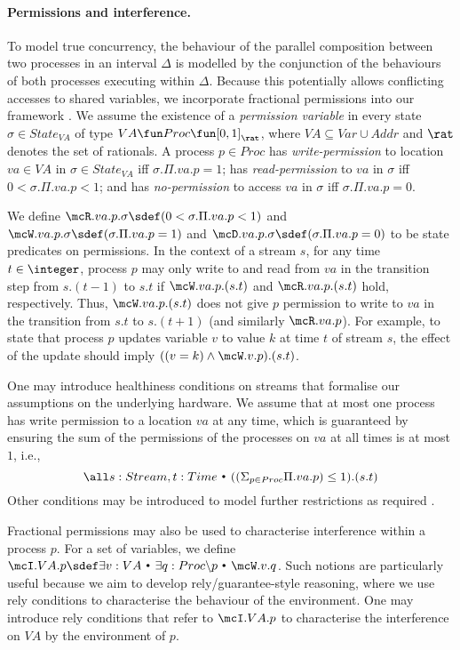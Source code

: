 \documentclass{article}
\newcommand{\st}{~{\scriptscriptstyle ^\bullet}~}
\theoremstyle{plain}
\theoremstyle{definition}
\def \bs {\backslash}
\begin{document}
\paragraph{Permissions and interference.}  
To model true concurrency, the behaviour of the parallel composition
between two processes in an interval $\Delta$ is modelled by the
conjunction of the behaviours of both processes executing within
$\Delta$. Because this potentially allows conflicting accesses to
shared variables, we incorporate fractional permissions into our
framework \cite{Boy03,DDH12}.  We assume the existence of a {\em
  permission variable} in every state $\sigma \in State_{VA}$ of type
$VA \fun Proc \fun [0,1]_\rat$, where $VA \subseteq Var \cup Addr$ and
$\rat$ denotes the set of rationals.
A process $p \in Proc$ has {\em write-permission} to location $va\in
VA$ in $\sigma \in State_{VA}$ iff $\sigma.\Pi.va.p = 1$; has {\em
  read-permission} to $va$ in $\sigma$ iff $0 < \sigma.\Pi.va.p < 1$;
and has {\em no-permission} to access $va$ in $\sigma$ iff
$\sigma.\Pi.va.p = 0$.


We define $\mcR.va.p.\sigma \sdef (0 < \sigma.\Pi.va.p < 1)$ and
$\mcW.va.p.\sigma \sdef (\sigma.\Pi.va.p = 1)$ and $\mcD.va.p.\sigma
\sdef (\sigma.\Pi.va.p = 0)$ to be state predicates on permissions.
In the context of a stream $s$, for any time $t \in \integer$, process
$p$ may only write to and read from $va$ in the transition step from
$s.(t-1)$ to $s.t$ if $\mcW.va.p.(s.t)$ and $\mcR.va.p.(s.t)$ hold,
respectively. Thus, $\mcW.va.p.(s.t)$ does not give $p$ permission to write to $va$
in the transition from $s.t$ to $s.(t+1)$ (and similarly $\mcR.va.p$).
For example, to state that process $p$ updates variable $v$ to value
$k$ at time $t$ of stream $s$, the effect of the update should imply
$((v = k) \land \mcW.v.p).(s.t)$.

One may introduce healthiness conditions on streams that formalise our
assumptions on the underlying hardware. We assume that at most one
process has write permission to a location $va$ at any time, which is
guaranteed by ensuring the sum of the permissions of the processes on
$va$ at all times is at most $1$, i.e., $$\all s: Stream, t: Time \st
((\displaystyle\Sigma_{p \in Proc} \Pi.va.p) \leq 1).(s.t)$$ Other
conditions may be introduced to model further restrictions as required
\cite{DDH12}.

Fractional permissions may also be used to characterise interference
within a process $p$. For a set of variables, we define $\mcI.VA.p 
\sdef  \exists v : VA \st \exists q : Proc \bs p \st \mcW.v.q$. Such notions are particularly useful because we aim to develop
rely/guarantee-style reasoning, where we use rely conditions to
characterise the behaviour of the environment. One may introduce rely
conditions that refer to $\mcI.VA.p$ to characterise the interference
on $VA$ by the environment of $p$.
\end{document}
